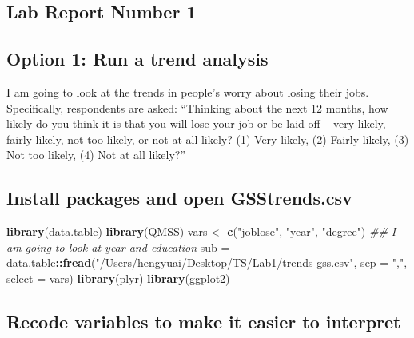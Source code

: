 \documentclass[]{article}
\title{}
\author{}
\date{}
\newenvironment{Shaded}{\begin{snugshade}}{\end{snugshade}}
\newcommand{\CommentTok}[1]{\textcolor[rgb]{0.56,0.35,0.01}{\textit{#1}}}
\newcommand{\DataTypeTok}[1]{\textcolor[rgb]{0.13,0.29,0.53}{#1}}
\newcommand{\KeywordTok}[1]{\textcolor[rgb]{0.13,0.29,0.53}{\textbf{#1}}}
\newcommand{\NormalTok}[1]{#1}
\newcommand{\OperatorTok}[1]{\textcolor[rgb]{0.81,0.36,0.00}{\textbf{#1}}}
\newcommand{\StringTok}[1]{\textcolor[rgb]{0.31,0.60,0.02}{#1}}
\begin{document}
\hypertarget{lab-report-number-1}{%
\subsection{Lab Report Number 1}\label{lab-report-number-1}}

\hypertarget{option-1-run-a-trend-analysis}{%
\subsection{Option 1: Run a trend
analysis}\label{option-1-run-a-trend-analysis}}

I am going to look at the trends in people's worry about losing their
jobs. Specifically, respondents are asked: ``Thinking about the next 12
months, how likely do you think it is that you will lose your job or be
laid off -- very likely, fairly likely, not too likely, or not at all
likely? (1) Very likely, (2) Fairly likely, (3) Not too likely, (4) Not
at all likely?''

\hypertarget{install-packages-and-open-gsstrends.csv}{%
\subsection{Install packages and open
GSStrends.csv}\label{install-packages-and-open-gsstrends.csv}}

\begin{Shaded}
\begin{Highlighting}[]
\KeywordTok{library}\NormalTok{(data.table)}
\KeywordTok{library}\NormalTok{(QMSS)}
\NormalTok{vars <-}\StringTok{ }\KeywordTok{c}\NormalTok{(}\StringTok{"joblose"}\NormalTok{, }\StringTok{"year"}\NormalTok{, }\StringTok{"degree"}\NormalTok{)  }\CommentTok{## I am going to look at year and education}
\NormalTok{sub =}\StringTok{ }\NormalTok{data.table}\OperatorTok{::}\KeywordTok{fread}\NormalTok{(}\StringTok{"/Users/hengyuai/Desktop/TS/Lab1/trends-gss.csv"}\NormalTok{,}
                        \DataTypeTok{sep =} \StringTok{","}\NormalTok{,}
                        \DataTypeTok{select =}\NormalTok{ vars)}
\KeywordTok{library}\NormalTok{(plyr)}
\KeywordTok{library}\NormalTok{(ggplot2)}
\end{Highlighting}
\end{Shaded}

\hypertarget{recode-variables-to-make-it-easier-to-interpret}{%
\subsection{Recode variables to make it easier to
interpret}\label{recode-variables-to-make-it-easier-to-interpret}}
\end{document}
